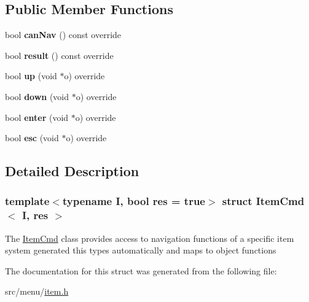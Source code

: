 \subsection*{Public Member Functions}
\begin{DoxyCompactItemize}
\item 
\mbox{\label{structItemCmd_a557f384fe3a5fd259fb780cd625f5999}} 
bool {\bfseries can\+Nav} () const override
\item 
\mbox{\label{structItemCmd_ad3265b47195a0ef366cceaf9a49006bb}} 
bool {\bfseries result} () const override
\item 
\mbox{\label{structItemCmd_a4fdc8aa98593990b0624f23ead5406d5}} 
bool {\bfseries up} (void $\ast$o) override
\item 
\mbox{\label{structItemCmd_ac0f94b985d35d18bf876f13bc99b5227}} 
bool {\bfseries down} (void $\ast$o) override
\item 
\mbox{\label{structItemCmd_a1fbdc11692ef58433eebfa12b4f102d0}} 
bool {\bfseries enter} (void $\ast$o) override
\item 
\mbox{\label{structItemCmd_a350f85aeabb638c42390f81ffe4a52d6}} 
bool {\bfseries esc} (void $\ast$o) override
\end{DoxyCompactItemize}


\subsection{Detailed Description}
\subsubsection*{template$<$typename I, bool res = true$>$\newline
struct Item\+Cmd$<$ I, res $>$}

The \hyperlink{structItemCmd}{Item\+Cmd} class provides access to navigation functions of a specific item system generated this types automatically and maps to object functions 

The documentation for this struct was generated from the following file\+:\begin{DoxyCompactItemize}
\item 
src/menu/\hyperlink{item_8h}{item.\+h}\end{DoxyCompactItemize}
